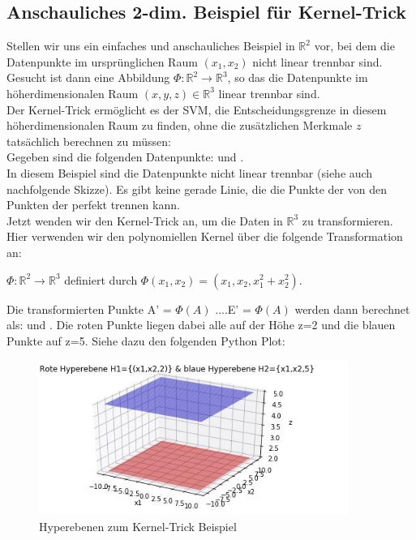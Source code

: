 \documentclass[12pt]{article}
\begin{document}
\subsection{Anschauliches 2-dim. Beispiel für Kernel-Trick}

Stellen wir uns ein einfaches und anschauliches Beispiel in $\mathbb{R}^2$ vor, bei dem die Datenpunkte im ursprünglichen Raum $(x_1,x_2)$ nicht linear trennbar sind.\\ 
Gesucht ist dann eine Abbildung $\Phi:\mathbb{R}^2 \rightarrow\mathbb{R}^3$, so das die Datenpunkte im höherdimensionalen Raum $(x,y,z)\in  \mathbb{R}^3$ linear trennbar sind.\\ 
Der Kernel-Trick ermöglicht es der SVM, die Entscheidungsgrenze in diesem höherdimensionalen Raum zu finden, ohne die zusätzlichen Merkmale $z$ tatsächlich berechnen zu müssen:\\ 
Gegeben sind die folgenden Datenpunkte: {\color{red}{Klasse +1: A(1,1), B(-1,1)}} und {\color{blue}{Klasse -1: C'(2,1), D(1,-2) und E(-2,1)}}.\\
In diesem Beispiel sind die Datenpunkte nicht linear trennbar (siehe auch nachfolgende Skizze). Es gibt keine gerade Linie, die die Punkte der {\color{red}{Klasse +1}} von den Punkten der {\color{blue}{Klasse -1}} perfekt trennen kann.\\
Jetzt wenden wir den Kernel-Trick an, um die Daten in $\mathbb{R}^3$ zu transformieren. Hier verwenden wir den polynomiellen Kernel über die folgende Transformation an: 
\begin{center}
 $\Phi:\mathbb{R}^2 \rightarrow\mathbb{R}^3$ definiert durch  $\Phi(x_1,x_2) = (x_1,x_2, x_1^2 + x_2^2)$. 
\end{center} 
Die transformierten Punkte A' = $\Phi(A)$ ....E' = $\Phi(A)$ werden dann berechnet als: {\color{red}{Klasse +1: A'(1,1,2), B'(-1,1,2)}} und {\color{blue}{Klasse -1: C'(2,1,5), D'(1,-2,5) und E'(-2,1,5)}}. Die roten Punkte liegen dabei alle auf der Höhe z=2 und die blauen Punkte auf z=5. Siehe dazu den folgenden Python Plot:\\[0.2cm]
\newpage
\begin{figure}[ht]
  \centering
  \hspace*{-0.5cm} 
  \includegraphics[width=0.9\textwidth]{Kernel-Hyperebene-Bild}
  \caption{Hyperebenen zum Kernel-Trick Beispiel}
  \label{fig:SVM_Ebenen}
\end{figure}
\end{document}
